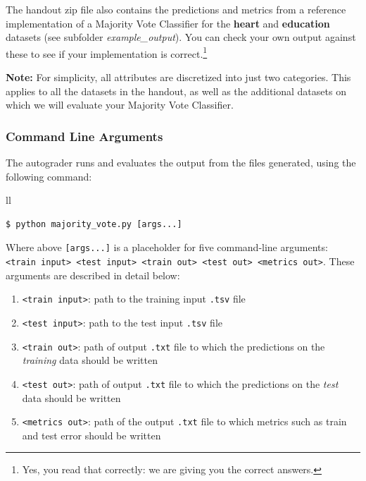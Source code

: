 \documentclass[11pt,addpoints,answers]{exam}
\begin{document}
The handout zip file also contains the predictions and metrics from a reference implementation of a Majority Vote Classifier for the \textbf{heart} and \textbf{education} datasets (see subfolder \emph{example\_output}). You can check your own output against these to see if your implementation is correct.\footnote{Yes, you read that correctly: we are giving you the correct answers.}

\begin{notebox} \textbf{Note:}
For simplicity, all attributes are discretized into just two categories. This applies to all the datasets in the handout, as well as the additional datasets on which we will evaluate your Majority Vote Classifier.
\end{notebox}

\subsubsection{Command Line Arguments}

The autograder runs and evaluates the output from the files  generated, using the following command:

\begin{tabular}{ll}
\begin{lstlisting}[language=Shell]
$ python majority_vote.py [args...]

\end{lstlisting}
\end{tabular}

Where above \lstinline{[args...]} is a placeholder for five command-line arguments: 
\texttt{<train input> <test input> <train out> <test out> <metrics out>}. These arguments are described in detail below:
\begin{enumerate}
\item \lstinline{<train input>}: path to the training input \lstinline{.tsv} file 
\item \lstinline{<test input>}: path to the test input \lstinline{.tsv} file 
\item \lstinline{<train out>}: path of output \lstinline{.txt} file to which the predictions on the \textit{training} data should be written 
\item \lstinline{<test out>}: path of output \lstinline{.txt} file to which the predictions on the \emph{test} data should be written 
\item \lstinline{<metrics out>}: path of the output \lstinline{.txt} file to which metrics such as train and test error should be written 
\end{enumerate}
\end{document}
